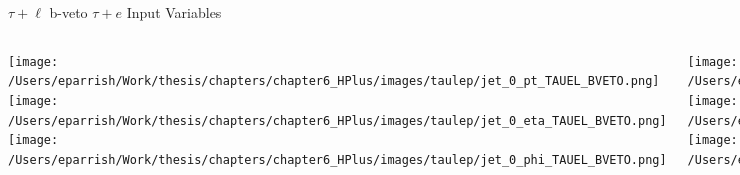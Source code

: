 \documentclass[aspectratio=169,xcolor=table]{beamer}
\begin{document}
    \begin{frame}[t]{$\tau+\ell$ b-veto $\tau+e$ Input Variables}
      \begin{columns}[t]
          \texttt{[image: /Users/eparrish/Work/thesis/chapters/chapter6\_HPlus/images/taulep/jet\_0\_pt\_TAUEL\_BVETO.png]}
          \texttt{[image: /Users/eparrish/Work/thesis/chapters/chapter6\_HPlus/images/taulep/jet\_0\_eta\_TAUEL\_BVETO.png]}
          \texttt{[image: /Users/eparrish/Work/thesis/chapters/chapter6\_HPlus/images/taulep/jet\_0\_phi\_TAUEL\_BVETO.png]}

          \texttt{[image: /Users/eparrish/Work/thesis/chapters/chapter6\_HPlus/images/taulep/lep\_0\_pt\_TAUEL\_BVETO.png]}
          \texttt{[image: /Users/eparrish/Work/thesis/chapters/chapter6\_HPlus/images/taulep/lep\_0\_eta\_TAUEL\_BVETO.png]}
          \texttt{[image: /Users/eparrish/Work/thesis/chapters/chapter6\_HPlus/images/taulep/lep\_0\_phi\_TAUEL\_BVETO.png]}

          \texttt{[image: /Users/eparrish/Work/thesis/chapters/chapter6\_HPlus/images/taulep/el\_0\_pt\_TAUEL\_BVETO.png]}
          \texttt{[image: /Users/eparrish/Work/thesis/chapters/chapter6\_HPlus/images/taulep/el\_0\_eta\_TAUEL\_BVETO.png]}
          \texttt{[image: /Users/eparrish/Work/thesis/chapters/chapter6\_HPlus/images/taulep/el\_0\_phi\_TAUEL\_BVETO.png]}

          \texttt{[image: /Users/eparrish/Work/thesis/chapters/chapter6\_HPlus/images/taulep/mu\_0\_pt\_TAUEL\_BVETO.png]}
          \texttt{[image: /Users/eparrish/Work/thesis/chapters/chapter6\_HPlus/images/taulep/mu\_0\_eta\_TAUEL\_BVETO.png]}
          \texttt{[image: /Users/eparrish/Work/thesis/chapters/chapter6\_HPlus/images/taulep/mu\_0\_phi\_TAUEL\_BVETO.png]}

      \end{columns}
    \end{frame}
\end{document}
